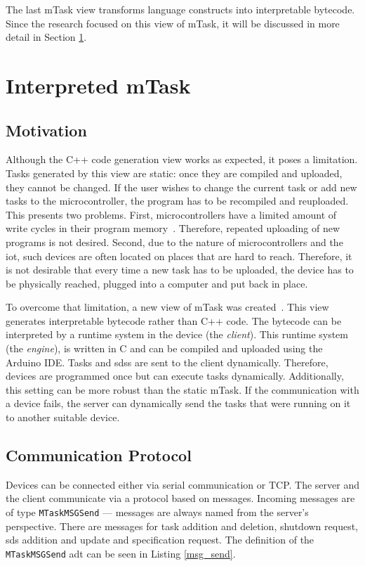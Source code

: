 The last mTask view transforms language constructs into interpretable bytecode. Since the research focused on this view of mTask, it will be discussed in more detail in Section \ref{sec:int_mtask}.

\section{Interpreted mTask}\label{sec:int_mtask}

\subsection{Motivation}

Although the C++ code generation view works as expected, it poses a limitation. Tasks generated by this view are static: once they are compiled and uploaded, they cannot be changed. If the user wishes to change the current task or add new tasks to the microcontroller, the program has to be recompiled and reuploaded. This presents two problems. First, microcontrollers have a limited amount of write cycles in their program memory~\cite{martthesis}. Therefore, repeated uploading of new programs is not desired. Second, due to the nature of microcontrollers and the \ac{iot}, such devices are often located on places that are hard to reach. Therefore, it is not desirable that every time a new task has to be uploaded, the device has to be physically reached, plugged into a computer and put back in place.

To overcome that limitation, a new view of mTask was created~\cite{martthesis}. This view generates interpretable bytecode rather than C++ code. The bytecode can be interpreted by a runtime system in the device (the \textit{client}). This runtime system (the \textit{engine}), is written in C and can be compiled and uploaded using the Arduino IDE. Tasks and \acp{sds} are sent to the client dynamically. Therefore, devices are programmed once but can execute tasks dynamically. Additionally, this setting can be more robust than the static mTask. If the communication with a device fails, the server can dynamically send the tasks that were running on it to another suitable device. 

\subsection{Communication Protocol}

Devices can be connected either via serial communication or TCP. The server and the client communicate via a protocol based on messages. Incoming messages are of type \texttt{MTaskMSGSend} --- messages are always named from the server's perspective. There are messages for task addition and deletion, shutdown request, \ac{sds} addition and update and specification request. The definition of the \texttt{MTaskMSGSend} \ac{adt} can be seen in Listing \ref{msg_send}.

